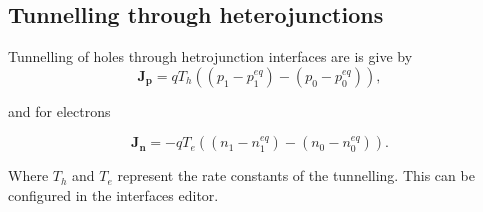 \subsection{Tunnelling through heterojunctions}
Tunnelling of holes through hetrojunction interfaces are is give by
\begin{equation}
\boldsymbol{J_p} = q T_{h}  ((p_{1}-p_{1}^{eq})-(p_{0}-p_{0}^{eq})),
\end{equation}

and for electrons

\begin{equation}
\boldsymbol{J_n} = -q T_{e}  ((n_{1}-n_{1}^{eq})-(n_{0}-n_{0}^{eq})).
\end{equation}

Where $T_{h}$ and $T_{e}$ represent the rate constants of the tunnelling. This can be configured in the interfaces editor.
